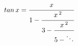 \documentclass[12pt]{amsart}
\begin{document}
\sicpsize
\[
tan \, x = \cfrac{x}%
                 {1 - \cfrac{x \, ^2}%
                            {3 - \cfrac{x \, ^2}%
                                       {5 - \ddots}}}
\]
\end{document}

